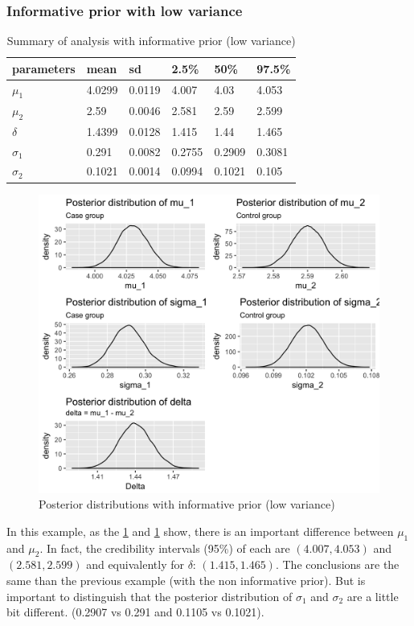 \documentclass{article}
\begin{document}
\newpage

\subsubsection{Informative prior with low variance}
\begin{table}[ht!]
\centering
\caption{Summary of analysis with informative prior (low variance)}
\label{tbl:2}
\begin{tabular}{|l|lllll|}
\hline
parameters & mean   & sd     & 2.5\%  & 50\%   & 97.5\% \\ \hline
$\mu_1$    & 4.0299 & 0.0119 & 4.007  & 4.03   & 4.053  \\
$\mu_2$    & 2.59   & 0.0046 & 2.581  & 2.59   & 2.599  \\
$\delta$   & 1.4399 & 0.0128 & 1.415  & 1.44   & 1.465  \\
$\sigma_1$ & 0.291  & 0.0082 & 0.2755 & 0.2909 & 0.3081 \\
$\sigma_2$ & 0.1021 & 0.0014 & 0.0994 & 0.1021 & 0.105  \\ \hline
\end{tabular}
\end{table}

\begin{figure}[ht!]
  \centering
  \includegraphics[width=.8\textwidth]{imgs/01_posterior_low.png}
  \caption{Posterior distributions with informative prior (low variance)}
  \label{fig:fig3}
\end{figure}

In this example, as the \cref{fig:fig3} and \cref{tbl:2} show, there is an important difference between $\mu_1$ and $\mu_2$. In fact, the credibility intervals (95\%) of each are $(4.007, 4.053)$ and $(2.581, 2.599)$ and equivalently for $\delta$: $(1.415, 1.465)$. The conclusions are the same than the previous example (with the non informative prior). But is important to distinguish that the posterior distribution of $\sigma_1$ and $\sigma_2$ are a little bit different. (0.2907 vs 0.291 and 0.1105 vs 0.1021).
\end{document}

